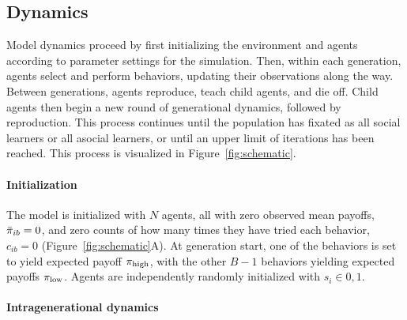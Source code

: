 \documentclass[letterpaper,11.5pt]{scrartcl}
\begin{document}
\subsection{Dynamics}

Model dynamics proceed by first initializing the environment and agents according
to parameter settings for the simulation. Then, within each generation,
agents select and perform behaviors, updating their observations along the way.
Between generations, agents reproduce, teach child agents, and die off. 
Child agents then begin a new round of generational dynamics, followed by
reproduction. This process continues until the population has fixated as
all social learners or all asocial learners, or until an upper limit of 
iterations has been reached. This process is visualized in
Figure~\ref{fig:schematic}.


\paragraph{Initialization}

The model is initialized with $N$ agents, all with zero observed mean payoffs, 
$\bar\pi_{ib} = 0$, and zero counts of how many times
they have tried each behavior, $c_{ib} = 0$ (Figure~\ref{fig:schematic}A).
At generation start, one of the behaviors is set to 
yield expected payoff $\pi_{\mathrm{high}}$, with the other $B-1$ behaviors yielding
expected payoffs $\pi_{\mathrm{low}}$. Agents are independently randomly initialized with $s_i
\in 0,1$.


\paragraph{Intragenerational dynamics}
\end{document}
